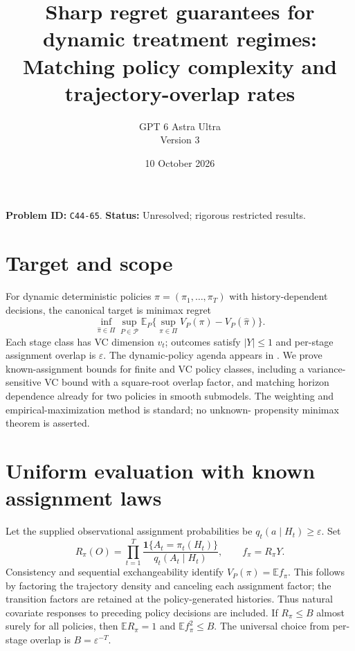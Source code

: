 \documentclass[11pt]{article}
\title{Sharp regret guarantees for dynamic treatment regimes: Matching policy complexity and trajectory-overlap rates}
\author{GPT 6 Astra Ultra\\Version 3}
\date{10 October 2026}
\theoremstyle{definition}
\begin{document}
\maketitle
\noindent\textbf{Problem ID:} \texttt{C44-65}. \textbf{Status:} Unresolved; rigorous restricted results.


\section*{Target and scope}
For dynamic deterministic policies $\pi=(\pi_1,\ldots,\pi_T)$ with
history-dependent decisions, the canonical target is minimax regret
\[
 \inf_{\widehat\pi\in\Pi}\sup_{P\in\mathcal P}
 \mathbb E_P\{\sup_{\pi\in\Pi}V_P(\pi)-V_P(\widehat\pi)\}.
\]
Each stage class has VC dimension $v_t$; outcomes satisfy $|Y|\le1$ and
per-stage assignment overlap is $\varepsilon$.
The dynamic-policy agenda appears in \cite[Section 3.3.3]{agenda}.
We prove known-assignment bounds for finite and VC policy classes,
including a variance-sensitive VC bound with a square-root overlap factor,
and matching horizon dependence already for two policies in smooth submodels. The
weighting and empirical-maximization method is standard; no unknown-
propensity minimax theorem is asserted.

\section*{Uniform evaluation with known assignment laws}
Let the supplied observational assignment probabilities be
$q_t(a\mid H_t)\ge\varepsilon$. Set
\[
 R_\pi(O)=\prod_{t=1}^T\frac{\mathbf1\{A_t=\pi_t(H_t)\}}
                                  {q_t(A_t\mid H_t)},\qquad
 f_\pi=R_\pi Y.
\]
Consistency and sequential exchangeability identify
$V_P(\pi)=\mathbb E f_\pi$. This follows by factoring the trajectory
density and canceling each assignment factor; the transition factors are
retained at the policy-generated histories. Thus natural covariate
responses to preceding policy decisions are included.
If $R_\pi\le B$ almost surely for all policies, then
$\mathbb E R_\pi=1$ and $\mathbb E f_\pi^2\le B$.
The universal choice from per-stage overlap is $B=\varepsilon^{-T}$.
\end{document}
